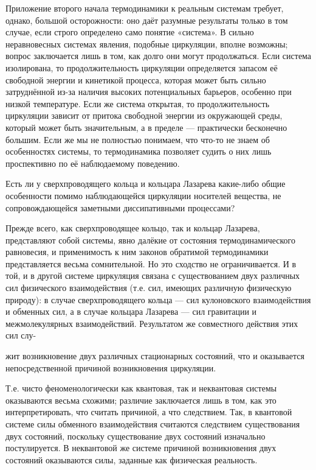 \documentclass[12pt,a4paper]{article}
\begin{document}
Приложение второго начала термодинамики к реальным системам требует, однако,
большой осторожности: оно даёт разумные результаты только в том случае, если
строго определено само понятие «система». В сильно неравновесных системах
явления, подобные циркуляции, вполне возможны; вопрос заключается лишь в том,
как долго они могут продолжаться. Если система изолирована, то продолжительность
циркуляции определяется запасом её свободной энергии и кинетикой процесса,
которая может быть сильно затруднённой из-за наличия высоких потенциальных
барьеров, особенно при низкой температуре. Если же система открытая, то
продолжительность циркуляции зависит от притока свободной энергии из
окружающей среды, который может быть значительным, а в пределе — практически
бесконечно большим. Если же мы не полностью понимаем, что что-то не знаем об
особенностях системы, то термодинамика позволяет судить о них лишь
проспективно по её наблюдаемому поведению.

Есть ли у сверхпроводящего кольца и кольцара Лазарева какие-либо общие
особенности помимо наблюдающейся циркуляции носителей вещества, не
сопровождающейся заметными диссипативными процессами?

Прежде всего, как сверхпроводящее кольцо, так и кольцар Лазарева,
представляют собой системы, явно далёкие от состояния термодинамического
равновесия, и применимость к ним законов обратимой термодинамики представляется
весьма сомнительной. Но это сходство не ограничивается. И в той, и в другой
системе циркуляция связана с существованием двух различных сил физического
взаимодействия (т.е. сил, имеющих различную физическую природу): в случае
сверхпроводящего кольца — сил кулоновского взаимодействия и обменных сил, а в
случае кольцара Лазарева — сил гравитации и межмолекулярных взаимодействий.
Результатом же совместного действия этих сил слу-

\newpage

жит возникновение двух различных стационарных состояний, что и оказывается
непосредственной причиной возникновения циркуляции.

Т.е. чисто феноменологически как квантовая, так и неквантовая системы
оказываются весьма схожими; различие заключается лишь в том, как это
интерпретировать, что считать причиной, а что следствием. Так, в квантовой
системе силы обменного взаимодействия считаются следствием существования двух
состояний, поскольку существование двух состояний изначально постулируется. В
неквантовой же системе причиной возникновения двух состояний оказываются силы,
заданные как физическая реальность.
\end{document}
